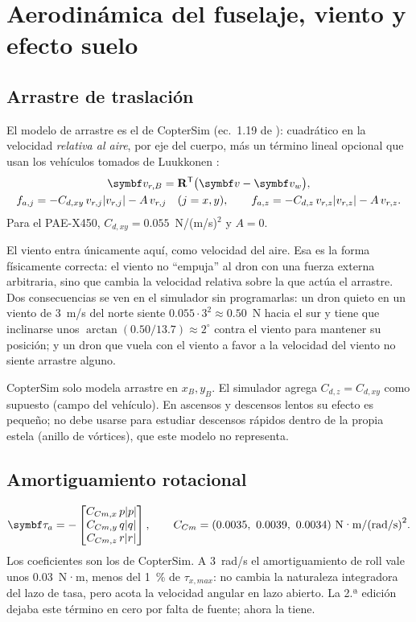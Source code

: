 \section{Aerodinámica del fuselaje, viento y efecto suelo}
\label{sec:aero}

\subsection{Arrastre de traslación}

El modelo de arrastre es el de CopterSim \cite{cs19} (ec.~1.19 de
\cite{qq20}): cuadrático en la velocidad \emph{relativa al aire}, por eje del
cuerpo, más un término lineal opcional que usan los vehículos tomados de
Luukkonen \cite{luukkonen11}:
\begin{gather}
\vect v_{r,B} = \R\T\big(\vect v - \vect v_w\big),\label{eq:vrel}\\
f_{a,j} = -C_{d,xy}\,v_{r,j}|v_{r,j}| - A\,v_{r,j}\quad (j=x,y),\qquad
f_{a,z} = -C_{d,z}\,v_{r,z}|v_{r,z}| - A\,v_{r,z}.\label{eq:drag}
\end{gather}
Para el PAE-X450, $C_{d,xy}=0.055$~N/(m/s)$^2$ y $A=0$.

El viento entra únicamente aquí, como velocidad del aire. Esa es la forma
físicamente correcta: el viento no ``empuja'' al dron con una fuerza
externa arbitraria, sino que cambia la velocidad relativa sobre la que actúa
el arrastre. Dos consecuencias se ven en el simulador sin programarlas: un
dron quieto en un viento de 3~m/s del norte siente
$0.055\cdot3^2\approx0.50$~N hacia el sur y tiene que inclinarse unos
$\arctan(0.50/13.7)\approx2^\circ$ contra el viento para mantener su
posición; y un dron que vuela con el viento a favor a la velocidad del
viento no siente arrastre alguno.

\begin{supuesto}
CopterSim solo modela arrastre en $x_B,y_B$. El simulador agrega
$C_{d,z}=C_{d,xy}$ como supuesto (campo  del vehículo). En
ascensos y descensos lentos su efecto es pequeño; no debe usarse para
estudiar descensos rápidos dentro de la propia estela (anillo de vórtices),
que este modelo no representa.
\end{supuesto}

\subsection{Amortiguamiento rotacional}

\begin{equation}
\vect\tau_a = -\begin{bmatrix}
C_{Cm,x}\,p|p|\\ C_{Cm,y}\,q|q|\\ C_{Cm,z}\,r|r|
\end{bmatrix},
\qquad C_{Cm}=(0.0035,\ 0.0039,\ 0.0034)\ \text{N·m/(rad/s)}^2 .
\label{eq:damp}
\end{equation}
Los coeficientes son los de CopterSim. A 3~rad/s el amortiguamiento de roll
vale unos 0.03~N·m, menos del 1~\% de $\tau_{x,max}$: no cambia la
naturaleza integradora del lazo de tasa, pero acota la velocidad angular
en lazo abierto. La 2.ª edición dejaba este término en cero por falta de
fuente; ahora la tiene.

